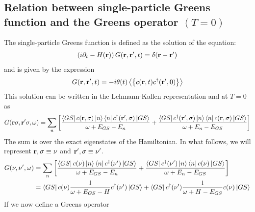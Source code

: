 \documentclass[reprint,hidelinks]{revtex4-2}
\begin{document}
\begin{widetext}
\section{Relation between single-particle Greens function and the Greens operator $(T=0)$}
 The single-particle Greens function is defined as the solution of the equation:
 \begin{equation}\begin{aligned}
	 \left(i\partial_t - H({\bf r})\right)G({\bf r},{\bf r}^\prime, t) = \delta({\bf r} - {\bf r}^\prime)
 \end{aligned}\end{equation}
 and is given by the expression
 \begin{equation}\begin{aligned}
	 G({\bf r},{\bf r}^\prime, t) = -i \theta(t) \left< \left\{ c({\bf r}, t) c^\dagger({\bf r}^\prime, 0)\right\} \right>
 \end{aligned}\end{equation}
 This solution can be written in the Lehmann-Kallen representation  and at $T=0$ as
 \begin{equation}\begin{aligned}
	 G({\bf r} \sigma, {\bf r}^\prime \sigma, \omega) = \sum_{n}\left[\frac{\bra{GS}c({{\bf r},\sigma})\ket{n}\bra{n}c^\dagger({\bf r}^\prime,\sigma)\ket{GS}}{\omega + E_{GS} - E_n} + \frac{\bra{GS}c^\dagger({\bf r}^\prime,\sigma)\ket{n}\bra{n}c({{\bf r},\sigma})\ket{GS}}{\omega + E_n - E_{GS}}\right]
 \end{aligned}\end{equation}
 The sum is over the exact eigenstates of the Hamiltonian. In what follows, we will represent ${\bf r},\sigma \equiv \nu$ and ${\bf r}^\prime,\sigma \equiv \nu^\prime$.
 \begin{equation}\begin{aligned}
	 G(\nu, \nu^\prime, \omega) &= \sum_{n}\left[\frac{\bra{GS}c(\nu)\ket{n}\bra{n}c^\dagger(\nu^\prime)\ket{GS}}{\omega + E_{GS} - E_n} + \frac{\bra{GS}c^\dagger(\nu^\prime)\ket{n}\bra{n}c(\nu)\ket{GS}}{\omega + E_n - E_{GS}}\right]\\
							&= \bra{GS}c(\nu)\frac{1}{\omega + E_{GS} - H}c^\dagger(\nu^\prime)\ket{GS} + \bra{GS}c^\dagger(\nu^\prime)\frac{1}{\omega + H - E_{GS}}c(\nu)\ket{GS}\\
 \end{aligned}\end{equation}
 If we now define a Greens operator
 \begin{equation}\begin{aligned}

\end{aligned}
\end{equation}
\end{widetext}
\end{document}
